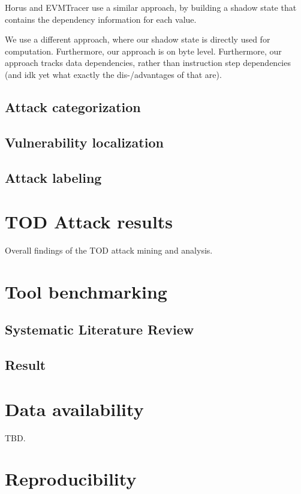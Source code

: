 \documentclass[draft,final]{vutinfth} %
\begin{document}
    Horus and EVMTracer use a similar approach, by building a shadow state that contains the dependency information for each value.

    We use a different approach, where our shadow state is directly used for computation. Furthermore, our approach is on byte level. Furthermore, our approach tracks data dependencies, rather than instruction step dependencies (and idk yet what exactly the dis-/advantages of that are).

    \section{Attack categorization}

    \section{Vulnerability localization}

    \section{Attack labeling}
\fi
\chapter{TOD Attack results}

Overall findings of the TOD attack mining and analysis.

\chapter{Tool benchmarking}

\section{Systematic Literature Review}

\section{Result}

\chapter{Data availability}

TBD.

\chapter{Reproducibility}
\label{cha:reproducibility}
\end{document}
